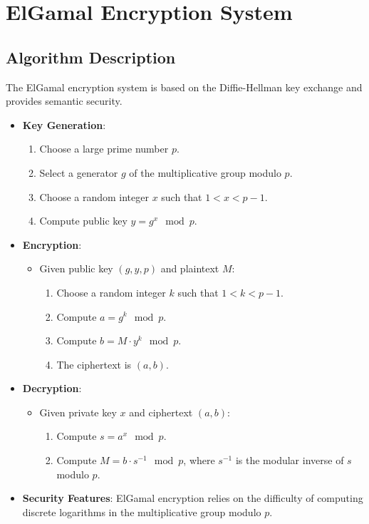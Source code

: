 \documentclass{article}
\begin{document}
\section{ElGamal Encryption System}

\subsection{Algorithm Description}
The ElGamal encryption system is based on the Diffie-Hellman key exchange and provides semantic security.
\begin{itemize}
    \item \textbf{Key Generation}:
    \begin{enumerate}
        \item Choose a large prime number \( p \).
        \item Select a generator \( g \) of the multiplicative group modulo \( p \).
        \item Choose a random integer \( x \) such that \( 1 < x < p-1 \).
        \item Compute public key \( y = g^x \mod p \).
    \end{enumerate}
    
    \item \textbf{Encryption}:
    \begin{itemize}
        \item Given public key \( (g, y, p) \) and plaintext \( M \):
        \begin{enumerate}
            \item Choose a random integer \( k \) such that \( 1 < k < p-1 \).
            \item Compute \( a = g^k \mod p \).
            \item Compute \( b = M \cdot y^k \mod p \).
            \item The ciphertext is \( (a, b) \).
        \end{enumerate}
    \end{itemize}
    
    \item \textbf{Decryption}:
    \begin{itemize}
        \item Given private key \( x \) and ciphertext \( (a, b) \):
        \begin{enumerate}
            \item Compute \( s = a^x \mod p \).
            \item Compute \( M = b \cdot s^{-1} \mod p \), where \( s^{-1} \) is the modular inverse of \( s \) modulo \( p \).
        \end{enumerate}
    \end{itemize}
    
    \item \textbf{Security Features}:
    ElGamal encryption relies on the difficulty of computing discrete logarithms in the multiplicative group modulo \( p \).
\end{itemize}
\end{document}
